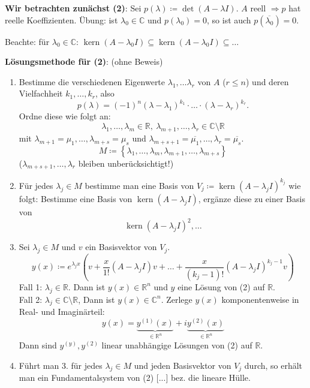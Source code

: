\documentclass[12pt]{extreport} %
\newcommand{\C}{\mathbb{C}}
\newcommand{\R}{\mathbb{R}}
\theoremstyle{named}
\theoremstyle{nnamed}
\theoremstyle{itshape}
\theoremstyle{normal}
\begin{document}
\textbf{Wir betrachten zunächst (2)}: Sei $p(\lambda) \coloneqq \det \left( A - \lambda I \right)$. $A$ reell $\Rightarrow p$ hat reelle Koeffizienten. Übung: ist $\lambda_{0} \in \C$ und $p(\lambda_{0}) = 0$, so ist auch $p(\overline{\lambda_{0}}) = 0$. 

\bigskip

Beachte: für $\lambda_{0} \in \C$: $\operatorname{kern} \left( A - \lambda_{0} I \right) \subseteq \operatorname{kern} \left( A - \lambda_{0} I \right) \subseteq \dotsc$

\bigskip

\textbf{Lösungsmethode für (2)}: (ohne Beweis) 
\begin{enumerate}[label=\arabic*.]
	\item Bestimme die verschiedenen Eigenwerte $\lambda_{1}, \dotsc \lambda_{r}$ von $A$ ($r \leq n$) und deren Vielfachheit $k_{1}, \dotsc, k_{r}$, also
		$$ p(\lambda) = \left( -1 \right)^{n} \left( \lambda - \lambda_{1} \right)^{k_{1}} \cdot \dotsc \cdot \left( \lambda - \lambda_{r} \right)^{k_{r}}. $$
		Ordne diese wie folgt an:
		$$ \lambda_{1}, \dotsc, \lambda_{m} \in \R, ~\lambda_{m+1}, \dotsc, \lambda_{r} \in \C \setminus \R $$
		mit $\lambda_{m+1} = \mu_{1}, \dotsc, \lambda_{m+s} = \mu_{s}$ und $\lambda_{m+s+1} = \overline{\mu_{1}}, \dotsc, \lambda_{r} = \overline{\mu_{s}}$.
		$$ M \coloneqq \left\{ \lambda_{1}, \dotsc, \lambda_{m}, \lambda_{m+1}, \dotsc, \lambda_{m+s} \right\} $$
		($\lambda_{m+s+1}, \dotsc, \lambda_{r}$ bleiben unberücksichtigt!)
	\item Für jedes $\lambda_{j} \in M$ bestimme man eine Basis von $V_{j} \coloneqq \operatorname{kern} \left( A - \lambda_{j} I \right)^{k_{j}}$ wie folgt: Bestimme eine Basis von $\operatorname{kern}\left( A - \lambda_{j} I \right)$, ergänze diese zu einer Basis von 
		$$ \operatorname{kern} \left( A - \lambda_{j} I \right)^{2}, \dotsc $$
	\item Sei $\lambda_{j} \in M$ und $v$ ein Basisvektor von $V_{j}$.
		$$ y(x) \coloneqq e^{\lambda_{j} x } \left( v + \frac{x}{1!} \left( A - \lambda_{j} I \right) v + \dotsc + \frac{x}{(k_{j} - 1)!} \left( A - \lambda_{j} I \right)^{k_{j} - 1} v \right) $$
		Fall 1: $\lambda_{j} \in \R$. Dann ist $y(x) \in \R^{n}$ und $y$ eine Lösung von (2) auf $\R$. ~\\
		Fall 2: $\lambda_{j} \in \C \setminus \R$, Dann ist $y(x) \in \C^{n}$. Zerlege $y(x)$ komponentenweise in Real- und Imaginärteil:
			$$ y(x) =\underbrace{y^{(1)}(x)}_{ \in \R^{n}} + i \underbrace{y^{(2)}(x)}_{\in \R^{n}} $$
			Dann sind $y^{(y)}, y^{(2)}$ linear unabhängige Lösungen von (2) auf $\R$.
	\item Führt man 3. für jedes $\lambda_{j} \in M$ und jeden Basisvektor von $V_{j}$ durch, so erhält man ein Fundamentalsystem von (2) [...] bez. die lineare Hülle.
\end{enumerate}
\end{document}
